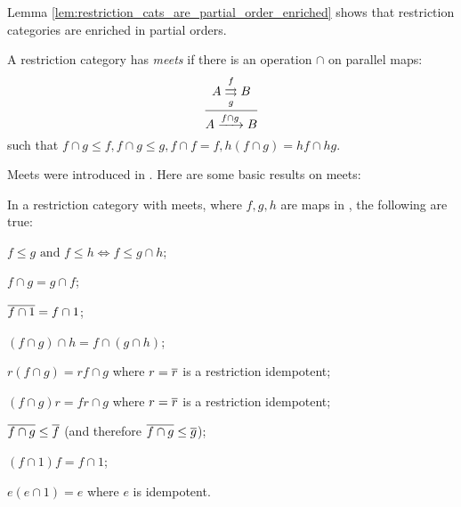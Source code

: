 Lemma \ref{lem:restriction_cats_are_partial_order_enriched} shows that restriction categories are enriched in
partial orders.

\begin{definition}
A restriction category has \emph{meets} if there is an operation
$\cap$ on parallel maps:
\[
\infer{A\xrightarrow{f\cap g} B}
  {A\overset{f}{\underset{g}{\rightrightarrows}}B}
\]
such that $f\cap g \le f, f\cap g \le g, f\cap f = f,
h (f\cap g) = h f \cap hg$.
\end{definition}

Meets were introduced in \cite{cockett-guo-hofstra-2012:range2}.
Here are some  basic results on meets:

\begin{lemma}\label{lem:properties_of_meets_in_restriction_categories}
In a restriction category \X with meets, where $f, g, h$ are maps in
\X, the following are true:
\bproofenum
\item $f\le g \text{ and } f \le h \iff f \le g\cap h$; \label{lemsub:properties_of_meets_one}
\item $f\cap g = g \cap f$;\label{lemsub:properties_of_meets_two}
\item $\overline{f\cap 1} = f \cap 1$;\label{lemsub:properties_of_meets_three}
\item $(f \cap g) \cap h = f \cap (g \cap h)$;
\item $r(f\cap g) = r f \cap g$ where $r=\overline{r}$ is a restriction idempotent;
\item $(f\cap g)r = f r \cap g$ where $r=\overline{r}$ is a restriction idempotent;
\item $\overline{f\cap g} \le \overline{f}$ (and therefore $\overline{f\cap g} \le \overline{g}$);
\item $ (f \cap 1) f = f \cap 1$;
\item $ e(e \cap 1) = e$ where $e$ is idempotent.
\eproofenum
\end{lemma}
